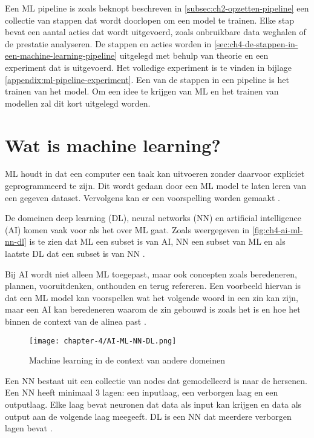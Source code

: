  
Een ML pipeline is zoals beknopt beschreven in \autoref{subsec:ch2-opzetten-pipeline} een collectie van stappen dat wordt doorlopen om een model te trainen. Elke stap bevat een aantal acties dat wordt uitgevoerd, zoals onbruikbare data weghalen of de prestatie analyseren. De stappen en acties worden in \autoref{sec:ch4-de-stappen-in-een-machine-learning-pipeline} uitgelegd met behulp van theorie en een experiment dat is uitgevoerd. Het volledige experiment is te vinden in bijlage \ref{appendix:ml-pipeline-experiment}. Een van de stappen in een pipeline is het trainen van het model. Om een idee te krijgen van ML en het trainen van modellen zal dit kort uitgelegd worden.

\section{Wat is machine learning?}\label{sec:ch4-wat-is-machine-learning}
ML houdt in dat een computer een taak kan uitvoeren zonder daarvoor expliciet geprogrammeerd te zijn. Dit wordt gedaan door een ML model te laten leren van een gegeven dataset. Vervolgens kan er een voorspelling worden gemaakt \cite[p.~1-3]{introduction-to-machine-learning}.

De domeinen deep learning (DL), neural networks (NN) en artificial intelligence (AI) komen vaak voor als het over ML gaat. Zoals weergegeven in \autoref{fig:ch4-ai-ml-nn-dl} is te zien dat ML een subset is van AI, NN een subset van ML en als laatste DL dat een subset is van NN \cite{ai-ml-nn-dl}. 

Bij AI wordt niet alleen ML toegepast, maar ook concepten zoals beredeneren, plannen, vooruitdenken, onthouden en terug refereren. Een voorbeeld hiervan is dat een ML model kan voorspellen wat het volgende woord in een zin kan zijn, maar een AI kan beredeneren waarom de zin gebouwd is zoals het is en hoe het binnen de context van de alinea past \cite{ml-think-about-ml-brownlee}.

\begin{figure}[hbt!]
  \centering
  \texttt{[image: chapter-4/AI-ML-NN-DL.png]}
  \caption{Machine learning in de context van andere domeinen}
  \label{fig:ch4-ai-ml-nn-dl}
\end{figure}

Een NN bestaat uit een collectie van nodes dat gemodelleerd is naar de hersenen. Een NN heeft minimaal 3 lagen: een inputlaag, een verborgen laag en een outputlaag. Elke laag bevat neuronen dat data als input kan krijgen en data als output aan de volgende laag meegeeft. DL is een NN dat meerdere verborgen lagen bevat \cite{ml-neural-network-nicholson}.

